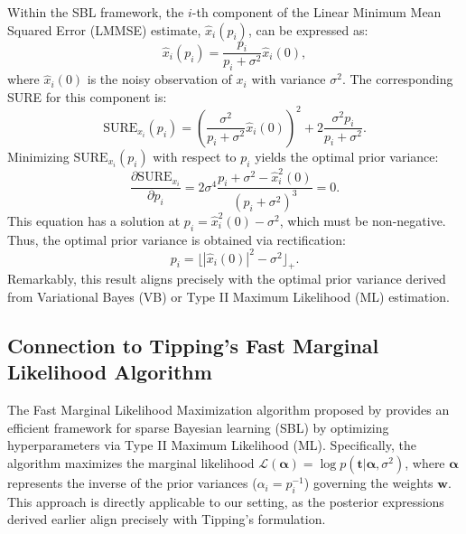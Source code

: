 \documentclass{article}
\begin{document}
Within the SBL framework, the \(i\)-th component of the Linear Minimum Mean Squared Error (LMMSE) estimate, \(\hat{x}_i(p_i)\), can be expressed as:
\begin{equation}
    \hat{x}_i(p_i) = \frac{p_i}{p_i + \sigma^2}\hat{x}_i(0),
\end{equation}
where \(\hat{x}_i(0)\) is the noisy observation of \(x_i\) with variance \(\sigma^2\). The corresponding SURE for this component is:
\begin{equation}
    \text{SURE}_{x_i}(p_i) = \left(\frac{\sigma^2}{p_i + \sigma^2}\hat{x}_i(0)\right)^2 + 2\frac{\sigma^2 p_i}{p_i + \sigma^2}.
\end{equation}
Minimizing \(\text{SURE}_{x_i}(p_i)\) with respect to \(p_i\) yields the optimal prior variance:
\begin{equation}
    \frac{\partial \text{SURE}_{x_i}}{\partial p_i} = 2\sigma^4 \frac{p_i + \sigma^2 - \hat{x}_i^2(0)}{(p_i + \sigma^2)^3} = 0.
\end{equation}
This equation has a solution at \(p_i = \hat{x}_i^2(0) - \sigma^2\), which must be non-negative. Thus, the optimal prior variance is obtained via rectification:
\begin{equation}
    p_i = \lfloor|\hat{x}_i(0)|^2 - \sigma^2\rfloor_+.
\end{equation}
Remarkably, this result aligns precisely with the optimal prior variance derived from Variational Bayes (VB) or Type II Maximum Likelihood (ML) estimation.


\subsection{Connection to Tipping's Fast Marginal Likelihood Algorithm}
The Fast Marginal Likelihood Maximization algorithm proposed by \citet{tipp2003fastsb} provides an efficient framework for sparse Bayesian learning (SBL) by optimizing hyperparameters via Type II Maximum Likelihood (ML). Specifically, the algorithm maximizes the marginal likelihood \(\mathcal{L}(\boldsymbol{\alpha}) = \log p(\mathbf{t}|\boldsymbol{\alpha}, \sigma^2)\), where \(\boldsymbol{\alpha}\) represents the inverse of the prior variances (\(\alpha_i = p_i^{-1}\)) governing the weights \(\mathbf{w}\). This approach is directly applicable to our setting, as the posterior expressions derived earlier align precisely with Tipping's formulation.  
\end{document}
